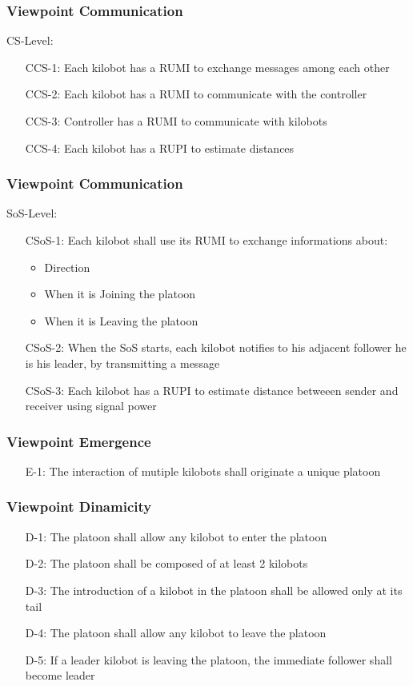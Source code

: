 \documentclass{beamer}
\begin{document}
\begin{frame}
\frametitle{Viewpoint Communication}
CS-Level:

\begin{enumerate}[align=left]
	\item[CCS-1:] Each kilobot has a RUMI to exchange messages among each other
	\item[CCS-2:] Each kilobot has a RUMI to communicate with the controller
	\item[CCS-3:] Controller has a RUMI to communicate with kilobots
	\item[CCS-4:] Each kilobot has a RUPI to estimate distances
\end{enumerate}
\end{frame}

\begin{frame}
\frametitle{Viewpoint Communication}
SoS-Level:

\begin{enumerate}[align=left]
	\item[CSoS-1:] Each kilobot shall use its RUMI to exchange informations about:
	\begin{itemize}
		\item Direction
		\item When it is Joining the platoon
		\item When it is Leaving the platoon
	\end{itemize}
	\item[CSoS-2:] When the SoS starts, each kilobot notifies to his adjacent follower he is his leader, by transmitting a message
	\item[CSoS-3:] Each kilobot has a RUPI to estimate distance betweeen sender and receiver using signal power
\end{enumerate}
\end{frame}

\begin{frame}
\frametitle{Viewpoint Emergence}
\begin{enumerate}[align=left]
	\item[E-1:] The interaction of mutiple kilobots shall originate a unique platoon
\end{enumerate}
\end{frame}

\begin{frame}
\frametitle{Viewpoint Dinamicity}
\begin{enumerate}[align=left]
	\item[D-1:] The platoon shall allow any kilobot to enter the platoon
	\item[D-2:] The platoon shall be composed of at least 2 kilobots
	\item[D-3:] The introduction of a kilobot in the platoon shall be allowed only at its tail
	\item[D-4:] The platoon shall allow any kilobot to leave the platoon
	\item[D-5:] If a leader kilobot is leaving the platoon, the immediate follower shall become leader
\end{enumerate}
\end{frame}
\end{document}
